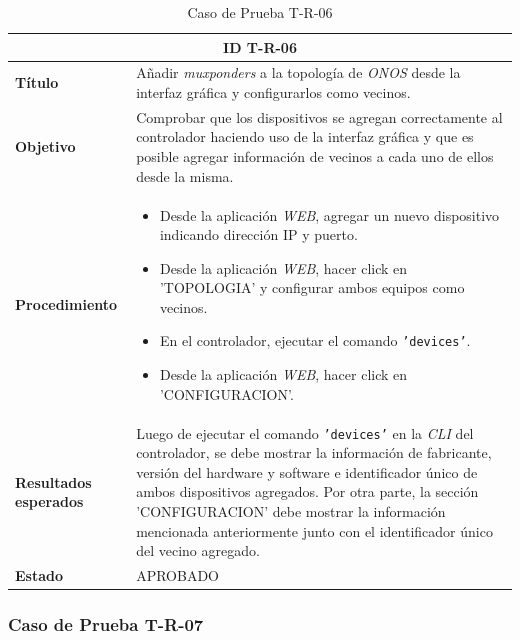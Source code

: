 \begin{table}[H]
  \centering
  \begin{tabular}{ |m{2.5cm}|m{11.5cm}|  }
  \hline
  \multicolumn{2}{|c|}{ \textbf{ID T-R-06} } \\
  \hline
  \centering
  \textbf{Título} & Añadir \textit{muxponders} a la topología de \textit{ONOS} desde la interfaz gráfica y configurarlos como vecinos.  \\
  \hline
  \centering
  \textbf{Objetivo} & Comprobar que los dispositivos se agregan correctamente al controlador haciendo uso de la interfaz gráfica y que es posible agregar información de vecinos a cada uno de ellos desde la misma.   \\
  \hline
  \centering
  \textbf{Procedimiento} & \begin{itemize}
    \item Desde la aplicación \textit{WEB}, agregar un nuevo dispositivo indicando dirección IP y puerto.
    \item Desde la aplicación \textit{WEB}, hacer click en 'TOPOLOGIA' y configurar ambos equipos como vecinos.
    \item En el controlador, ejecutar el comando \texttt{'devices'}.
    \item Desde la aplicación \textit{WEB}, hacer click en 'CONFIGURACION'.
  \end{itemize}     \\
  \hline
  \centering
  \textbf{Resultados esperados} & 
  Luego de ejecutar el comando \texttt{'devices'} en la \textit{CLI} del controlador, se debe mostrar la información de fabricante, versión del hardware y software e identificador único de ambos dispositivos agregados. 
Por otra parte, la sección 'CONFIGURACION' debe mostrar la información mencionada anteriormente junto con el identificador único del vecino agregado. 
  
    \\
  
    \hline
  \centering
    \textbf{Estado}    & APROBADO  \\
  \hline
  \end{tabular}
  
  \caption{Caso de Prueba T-R-06}
  \label{tab:TR06}
  \end{table}



  \subsubsection{Caso de Prueba T-R-07}

